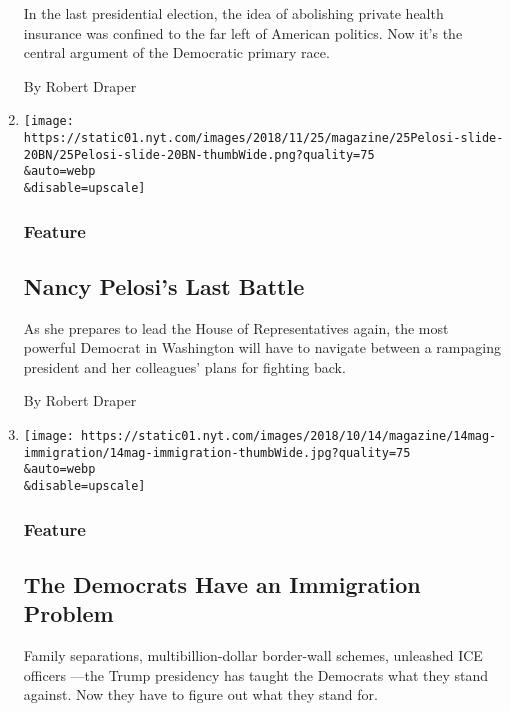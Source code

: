 \begin{enumerate}
  In the last presidential election, the idea of abolishing private
  health insurance was confined to the far left of American politics.
  Now it's the central argument of the Democratic primary race.

  By Robert Draper
\item
  \href{/2018/11/19/magazine/nancy-pelosi-house-democrats.html}{}

  \texttt{[image: https://static01.nyt.com/images/2018/11/25/magazine/25Pelosi-slide-20BN/25Pelosi-slide-20BN-thumbWide.png?quality=75\\\&auto=webp\\\&disable=upscale]}

  \hypertarget{feature-3}{%
  \subsubsection{Feature}\label{feature-3}}

  \hypertarget{nancy-pelosis-last-battle}{%
  \subsection{Nancy Pelosi's Last
  Battle}\label{nancy-pelosis-last-battle}}

  As she prepares to lead the House of Representatives again, the most
  powerful Democrat in Washington will have to navigate between a
  rampaging president and her colleagues' plans for fighting back.

  By Robert Draper
\item
  \href{/2018/10/10/magazine/the-democrats-have-an-immigration-problem.html}{}

  \texttt{[image: https://static01.nyt.com/images/2018/10/14/magazine/14mag-immigration/14mag-immigration-thumbWide.jpg?quality=75\\\&auto=webp\\\&disable=upscale]}

  \hypertarget{feature-4}{%
  \subsubsection{Feature}\label{feature-4}}

  \hypertarget{the-democrats-have-an-immigration-problem}{%
  \subsection{The Democrats Have an Immigration
  Problem}\label{the-democrats-have-an-immigration-problem}}

  Family separations, multibillion-dollar border-wall schemes, unleashed
  ICE officers ---the Trump presidency has taught the Democrats what
  they stand against. Now they have to figure out what they stand for.


\end{enumerate}
